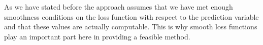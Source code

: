 As we have stated before the approach assumes that we have met enough smoothness conditions on the loss function with respect to the prediction variable and that these values are actually computable.
This is why smooth loss functions play an important part here in providing a feasible method.






